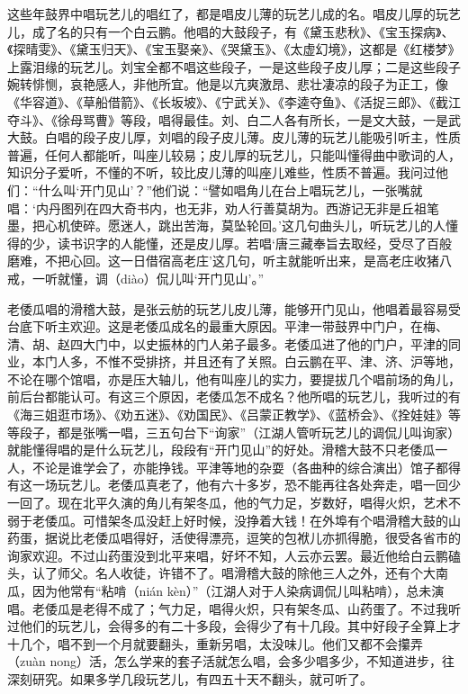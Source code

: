 \documentclass[12pt,UTF8]{ctexbook}
\begin{document}
这些年鼓界中唱玩艺儿的唱红了，都是唱皮儿薄的玩艺儿成的名。唱皮儿厚的玩艺儿，成了名的只有一个白云鹏。他唱的大鼓段子，有《黛玉悲秋》、《宝玉探病》、《探晴雯》、《黛玉归天》、《宝玉娶亲》、《哭黛玉》、《太虚幻境》，这都是《红楼梦》上露泪缘的玩艺儿。刘宝全都不唱这些段子，一是这些段子皮儿厚；二是这些段子婉转悱恻，哀艳感人，非他所宜。他是以亢爽激昂、悲壮凄凉的段子为正工，像《华容道》、《草船借箭》、《长坂坡》、《宁武关》、《李逵夺鱼》、《活捉三郎》、《截江夺斗》、《徐母骂曹》等段，唱得最佳。刘、白二人各有所长，一是文大鼓，一是武大鼓。白唱的段子皮儿厚，刘唱的段子皮儿薄。皮儿薄的玩艺儿能吸引听主，性质普遍，任何人都能听，叫座儿较易；皮儿厚的玩艺儿，只能叫懂得曲中歌词的人，知识分子爱听，不懂的不听，较比皮儿薄的叫座儿难些，性质不普遍。我问过他们：“什么叫‘开门见山’？”他们说：“譬如唱角儿在台上唱玩艺儿，一张嘴就唱：‘内丹图列在四大奇书内，也无非，劝人行善莫胡为。西游记无非是丘祖笔墨，把心机使碎。愿迷人，跳出苦海，莫坠轮回。’这几句曲头儿，听玩艺儿的人懂得的少，读书识字的人能懂，还是皮儿厚。若唱‘唐三藏奉旨去取经，受尽了百般磨难，不把心回。这一日借宿高老庄’这几句，听主就能听出来，是高老庄收猪八戒，一听就懂，调（diào）侃儿叫‘开门见山’。”

老倭瓜唱的滑稽大鼓，是张云舫的玩艺儿皮儿薄，能够开门见山，他唱着最容易受台底下听主欢迎。这是老倭瓜成名的最重大原因。平津一带鼓界中门户，在梅、清、胡、赵四大门中，以史振林的门人弟子最多。老倭瓜进了他的门户，平津的同业，本门人多，不惟不受排挤，并且还有了关照。白云鹏在平、津、济、沪等地，不论在哪个馆唱，亦是压大轴儿，他有叫座儿的实力，要提拔几个唱前场的角儿，前后台都能认可。有这三个原因，老倭瓜怎不成名？他所唱的玩艺儿，我听过的有《海三姐逛市场》、《劝五迷》、《劝国民》、《吕蒙正教学》、《蓝桥会》、《拴娃娃》等等段子，都是张嘴一唱，三五句台下“询家”（江湖人管听玩艺儿的调侃儿叫询家）就能懂得唱的是什么玩艺儿，段段有“开门见山”的好处。滑稽大鼓不只老倭瓜一人，不论是谁学会了，亦能挣钱。平津等地的杂耍（各曲种的综合演出）馆子都得有这一场玩艺儿。老倭瓜真老了，他有六十多岁，恐不能再往各处奔走，唱一回少一回了。现在北平久演的角儿有架冬瓜，他的气力足，岁数好，唱得火炽，艺术不弱于老倭瓜。可惜架冬瓜没赶上好时候，没挣着大钱！在外埠有个唱滑稽大鼓的山药蛋，据说比老倭瓜唱得好，活使得漂亮，逗笑的包袱儿亦抓得脆，很受各省市的询家欢迎。不过山药蛋没到北平来唱，好坏不知，人云亦云罢。最近他给白云鹏磕头，认了师父。名人收徒，许错不了。唱滑稽大鼓的除他三人之外，还有个大南瓜，因为他常有“粘啃（nián kèn）”（江湖人对于人染病调侃儿叫粘啃），总未演唱。老倭瓜是老得不成了；气力足，唱得火炽，只有架冬瓜、山药蛋了。不过我听过他们的玩艺儿，会得多的有二十多段，会得少了有十几段。其中好段子全算上才十几个，唱不到一个月就要翻头，重新另唱，太没味儿。他们又都不会攥弄（zuàn nong）活，怎么学来的套子活就怎么唱，会多少唱多少，不知道进步，往深刻研究。如果多学几段玩艺儿，有四五十天不翻头，就可听了。
\end{document}
